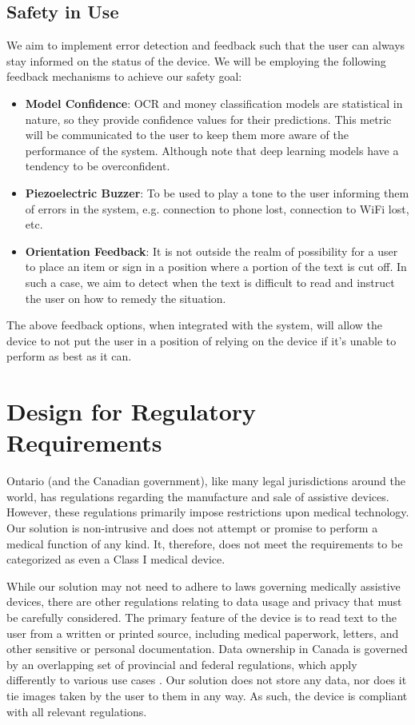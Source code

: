 \documentclass[a4paper,11pt]{article}
\begin{document}
\subsection{Safety in Use}
We aim to implement error detection and feedback such that the user can always stay informed on the status of the device. We will be employing the following feedback mechanisms to achieve our safety goal:
\begin{itemize}
    \item \textbf{Model Confidence}: OCR and money classification models are statistical in nature, so they provide confidence values for their predictions. This metric will be communicated to the user to keep them more aware of the performance of the system. Although note that deep learning models have a tendency to be overconfident.
    \item \textbf{Piezoelectric Buzzer}: To be used to play a tone to the user informing them of errors in the system, e.g. connection to phone lost, connection to WiFi lost, etc.
    \item \textbf{Orientation Feedback}: It is not outside the realm of possibility for a user to place an item or sign in a position where a portion of the text is cut off. In such a case, we aim to detect when the text is difficult to read and instruct the user on how to remedy the situation.
\end{itemize}
The above feedback options, when integrated with the system, will allow the device to not put the user in a position of relying on the device if it's unable to perform as best as it can.

\section{Design for Regulatory Requirements}
Ontario (and the Canadian government), like many legal jurisdictions around the world, has regulations regarding the manufacture and sale of assistive devices. However, these regulations primarily impose restrictions upon medical technology. Our solution is non-intrusive and does not attempt or promise to perform a medical function of any kind. It, therefore, does not meet the requirements to be categorized as even a Class I medical device.

While our solution may not need to adhere to laws governing medically assistive devices, there are other regulations relating to data usage and privacy that must be carefully considered. The primary feature of the device is to read text to the user from a written or printed source, including medical paperwork, letters, and other sensitive or personal documentation. Data ownership in Canada is governed by an overlapping set of provincial and federal regulations, which apply differently to various use cases \cite{pipeda}. Our solution does not store any data, nor does it tie images taken by the user to them in any way. As such, the device is compliant with all relevant regulations.
\end{document}
